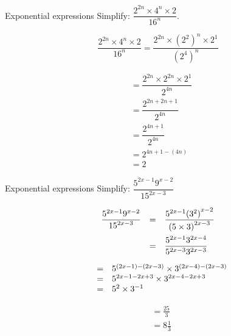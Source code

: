 \begin{wex}
{Exponential expressions}
{Simplify: $\dfrac{2^{2n} \times 4^n \times 2}{16^n}.$}
{

\begin{equation*}
  \dfrac{2^{2n} \times 4^n \times 2}{16^n} = \dfrac{2^{2n} \times (2^2)^n \times 2^1}{(2^4)^n} 
\end{equation*}

\begin{align*}
  &= \dfrac{2^{2n} \times 2^{2n} \times 2^1}{2^{4n}} \\
  &= \dfrac{2^{2n + 2n +1}}{2^{4n}} \\
  &= \dfrac{2^{4n+1}}{2^{4n}} \\
  &= 2^{4n+1-(4n)} \\
  &= 2
\end{align*}
}
\end{wex}

     
\begin{wex}
{Exponential expressions}
{Simplify: $\dfrac{{5}^{2x-1}  {9}^{x-2}}{{15}^{2x-3}}$}
{

\begin{equation*}
\begin{array}{lcl} \dfrac{{5}^{2x-1}  {9}^{x-2}}{{15}^{2x-3}}& =& \dfrac{{5}^{2x-1}  {({3}^{2})}^{x-2}}{{(5\times3)}^{2x-3}}\hfill \vspace{5pt}\\
		  & =& \dfrac{{5}^{2x-1}  {3}^{2x-4}}{{5}^{2x-3}  {3}^{2x-3}}\hfill 
\end{array}
\end{equation*}
  
\begin{equation*}
\begin{array}{lcl}
& =& {5}^{(2x-1)-(2x-3)} \times {3}^{(2x-4)-(2x-3)}\hfill \\ 
& =& 5^{2x-1-2x+3} \times 3^{2x-4 - 2x+3} \\
& =& {5}^{2} \times {3}^{-1}\hfill \end{array}
\end{equation*}


\begin{align*}
  &= \frac{25}{3} \\
  &= 8\frac{1}{3}
\end{align*}
}
\end{wex}


